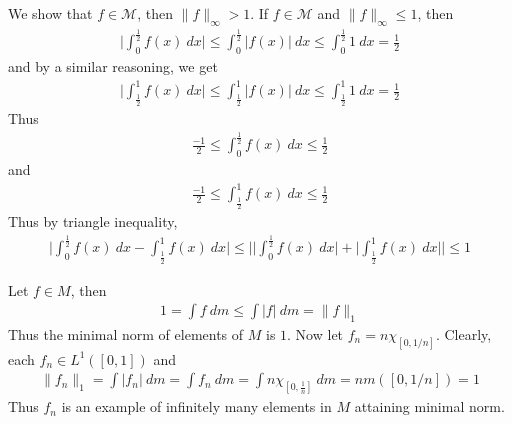 \documentclass[12pt]{exam}
\theoremstyle{plain} %
\theoremstyle{definition} %
\theoremstyle{remark} %
\begin{document}
\begin{questions}
\begin{solution}
    We show that $f \in \mathcal{M}$, then $\|f\|_\infty > 1$. If $f
    \in \mathcal{M}$ and $\|f\|_\infty \le 1$, then
    \begin{align*}
      \Big | \int_{0}^{\frac{1}{2}} f(x) \ dx \Big | \le
      \int_{0}^{\frac{1}{2}} |f(x)| \ dx \le \int_{0}^{\frac{1}{2}} 1
      \ dx = \frac{1}{2}
    \end{align*}
    and by a similar reasoning, we get
    \begin{align*}
      \Big|\int_{\frac{1}{2}}^{1} f(x) \ dx\Big| \le
      \int_{\frac{1}{2}}^{1} |f(x)| \ dx \le \int_{\frac{1}{2}}^{1} 1
      \ dx = \frac{1}{2}
    \end{align*}
    Thus
    \begin{align*}
      \frac{-1}{2} \le \int_{0}^{\frac{1}{2}} f(x) \ dx \le \frac{1}{2}
    \end{align*}
    and
    \begin{align*}
      \frac{-1}{2} \le \int_{\frac{1}{2}}^{1} f(x) \ dx \le \frac{1}{2}
    \end{align*}
    Thus by triangle inequality,
    \begin{align*}
      \Big|\int_{0}^{\frac{1}{2}} f(x) \ dx - \int_{\frac{1}{2}}^{1}
      f(x) \ dx\Big| \le \Bigg| \Big|\int_{0}^{\frac{1}{2}} f(x) \ dx
      \Big| + \Big|\int_{\frac{1}{2}}^{1}f(x) \ dx\Big|\Bigg| \le 1
    \end{align*}
  \end{solution}

  \question
  \begin{solution}
    Let $f \in M$, then
    \begin{align*}
      1 = \int f \ d m \le \int |f| \ d m = \|f\|_1
    \end{align*}
    Thus the minimal norm of elements of $M$ is $1$. Now let $f_n = n
    \chi_{[0, 1/n]}$. Clearly, each $f_n \in L^{1}([0, 1])$ and
    \begin{align*}
      \|f_n\|_1  = \int |f_n| \ d m = \int f_n \ d m = \int n
      \chi_{[0, \frac{1}{n}]} \ d m = n m([0,1/n]) = 1
    \end{align*}
    Thus $f_n$ is an example of infinitely many elements in $M$
    attaining minimal norm.
  \end{solution}


\end{questions}
\end{document}
